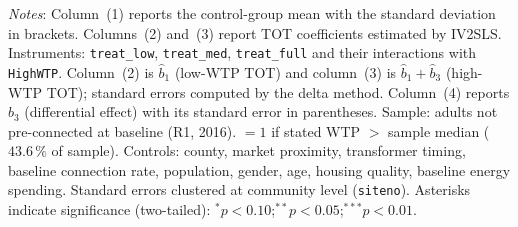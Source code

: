 \begin{table}[htbp]
\begin{minipage}{\linewidth}
\footnotesize
\setlength{\parskip}{2pt}
\textit{Notes}: Column~(1) reports the control-group mean with the standard
deviation in brackets. Columns~(2) and~(3) report TOT coefficients estimated
by IV2SLS. Instruments: \texttt{treat\_low}, \texttt{treat\_med},
\texttt{treat\_full} and their interactions with \texttt{HighWTP}.
Column~(2) is $\hat{b}_1$ (low-WTP TOT) and column~(3) is
$\hat{b}_1 + \hat{b}_3$ (high-WTP TOT); standard errors computed by the
delta method. Column~(4) reports $\hat{b}_3$ (differential effect) with its
standard error in parentheses. Sample: adults not pre-connected at baseline
(R1, 2016).  $= 1$ if stated WTP $>$ sample median ($43.6\,\%$
of sample). Controls: county, market proximity, transformer timing, baseline
connection rate, population, gender, age, housing quality, baseline energy
spending. Standard errors clustered at community level (\texttt{siteno}).
Asterisks indicate significance (two-tailed):
$^{*}p<0.10$;\;$^{**}p<0.05$;\;$^{***}p<0.01$.
\end{minipage}
\end{table}

